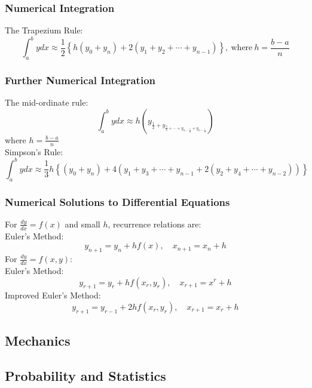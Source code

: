\documentclass{book}
\begin{document}
            \subsubsection{Numerical Integration}
                The Trapezium Rule:
                \begin{equation}
                    \int_a^bydx\approx\frac{1}{2}\left\{h(y_0+y_n)+2(y_1+y_2+\cdots+y_{n-1})\right\},\ \text{where}\ h=\frac{b-a}{n}
                \end{equation}
            
            \subsubsection{Further Numerical Integration}
                The mid-ordinate rule:
                \begin{equation}
                    \int_a^bydx\approx h\left(y_{\frac{1}{2}+y_{\frac{3}{2}+\cdots+y_{n-\frac{3}{2}}+y_{n-\frac{1}{2}}}}\right)
                \end{equation}
                where $h=\frac{b-a}{n}$ \\
                Simpson's Rule:
                \begin{equation}
                    \int_a^bydx\approx\frac{1}{3}h\left\{(y_0+y_n)+4(y_1+y_3+\cdots+y_{n-1}+2(y_2+y_4+\cdots+y_{n-2}))\right\}
                \end{equation}

            \subsubsection{Numerical Solutions to Differential Equations}
                For $\frac{dy}{dx}=f(x)$ and small $h$, recurrence relations are: \\
                Euler's Method:
                \begin{equation}
                    y_{n+1}=y_n+hf(x),\quad x_{n+1}=x_n+h
                \end{equation}
                For $\frac{dy}{dx}=f(x,y)$: \\
                Euler's Method:
                \begin{equation}
                    y_{r+1}=y_r+hf(x_r,y_r),\quad x_{r+1}=x^r+h
                \end{equation}
                Improved Euler's Method:
                \begin{equation}
                    y_{r+1}=y_{r-1}+2hf(x_r,y_r),\quad x_{r+1}=x_r+h
                \end{equation}

            \subsection{Mechanics}

        \subsection{Probability and Statistics}

    \newpage

\printnoidxglossary
\end{document}
